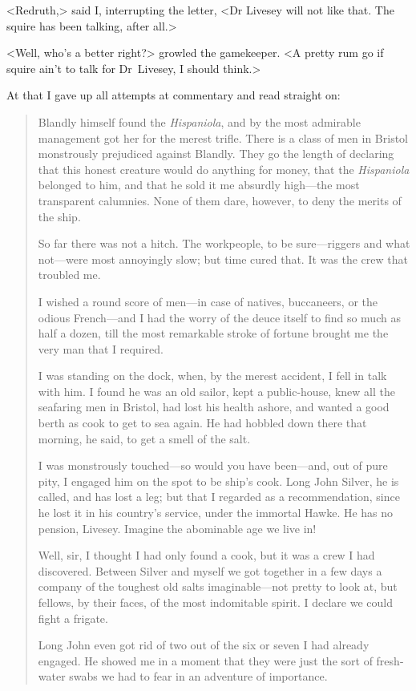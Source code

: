 <Redruth,> said I, interrupting the letter, <Dr Livesey will not like that. The squire has been talking, after all.>

<Well, who's a better right?> growled the gamekeeper. <A pretty rum go if squire ain't to talk for Dr~Livesey, I should think.>

At that I gave up all attempts at commentary and read straight on:

\begin{quotation}
Blandly himself found the \textit{Hispaniola}, and by the most admirable management got her for the merest trifle. There is a class of men in Bristol monstrously prejudiced against Blandly. They go the length of declaring that this honest creature would do anything for money, that the \textit{Hispaniola} belonged to him, and that he sold it me absurdly high—the most transparent calumnies. None of them dare, however, to deny the merits of the ship.

So far there was not a hitch. The workpeople, to be sure—riggers and what not—were most annoyingly slow; but time cured that. It was the crew that troubled me.

I wished a round score of men—in case of natives, buccaneers, or the odious French—and I had the worry of the deuce itself to find so much as half a dozen, till the most remarkable stroke of fortune brought me the very man that I required.

I was standing on the dock, when, by the merest accident, I fell in talk with him. I found he was an old sailor, kept a public-house, knew all the seafaring men in Bristol, had lost his health ashore, and wanted a good berth as cook to get to sea again. He had hobbled down there that morning, he said, to get a smell of the salt.

I was monstrously touched—so would you have been—and, out of pure pity, I engaged him on the spot to be ship's cook. Long John Silver, he is called, and has lost a leg; but that I regarded as a recommendation, since he lost it in his country's service, under the immortal Hawke. He has no pension, Livesey. Imagine the abominable age we live in!

Well, sir, I thought I had only found a cook, but it was a crew I had discovered. Between Silver and myself we got together in a few days a company of the toughest old salts imaginable—not pretty to look at, but fellows, by their faces, of the most indomitable spirit. I declare we could fight a frigate.


Long John even got rid of two out of the six or seven I had already engaged. He showed me in a moment that they were just the sort of fresh-water swabs we had to fear in an adventure of importance.


\end{quotation}
